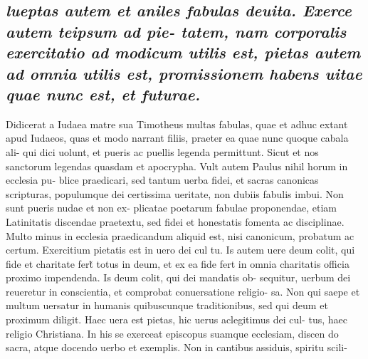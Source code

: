 \documentclass{article}
\begin{document}
\begin{pages}
\subsection*{\textit{lueptas autem et aniles fabulas deuita. Exerce autem teipsum ad pie- tatem, nam corporalis exercitatio ad modicum utilis est, pietas autem ad omnia utilis est, promissionem habens uitae quae nunc est, et futurae. }}\pstart Didicerat a Iudaea matre sua Timotheus multas fabulas, quae et adhuc extant apud Iudaeos, quas et modo narrant filiis, praeter ea quae nunc quoque cabala ali- qui dici uolunt, et pueris ac puellis legenda permittunt. Sicut et nos sanctorum legendas quasdam et apocrypha. Vult autem Paulus nihil horum in ecclesia pu- blice praedicari, sed tantum uerba fidei, et sacras canonicas scripturas, populumque  dei certissima ueritate, non dubiis fabulis imbui. Non sunt pueris nudae et non ex- plicatae poetarum fabulae proponendae, etiam Latinitatis discendae praetextu, sed fidei et honestatis fomenta ac disciplinae. Multo minus in ecclesia praedicandum aliquid est, nisi canonicum, probatum ac certum. Exercitium pietatis est in uero dei cul tu. Is autem uere deum colit, qui fide et charitate fert̃ totus in deum, et ex ea fide fert in omnia charitatis officia proximo impendenda. Is deum colit, qui dei mandatis ob- sequitur, uerbum dei reueretur in conscientia, et comprobat conuersatione religio- sa. Non qui saepe et multum uersatur in humanis quibuscunque traditionibus, sed qui deum et proximum diligit. Haec uera est pietas, hic uerus aclegitimus dei cul- tus, haec religio Christiana. In his se exerceat episcopus suamque ecclesiam, discen do sacra, atque docendo uerbo et exemplis. Non in cantibus assiduis, spiritu scili-  \pend

\end{pages}
\end{document}
